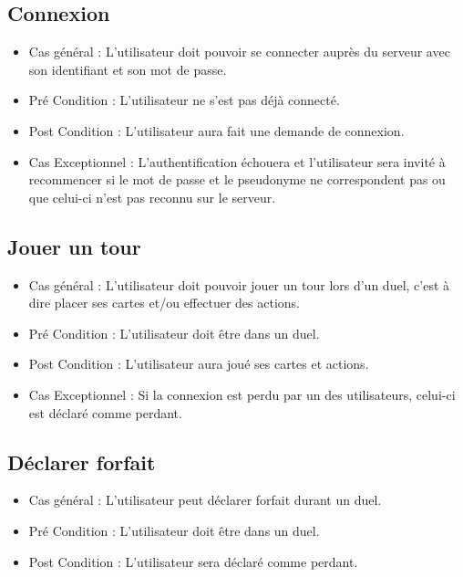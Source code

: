 \subsection{Connexion}

\begin{itemize}
    \item Cas général : L'utilisateur doit pouvoir se connecter auprès du {serveur} avec son identifiant et son mot de passe.
    \item Pré Condition  : L'utilisateur ne s'est pas déjà connecté.
    \item Post Condition : L'utilisateur aura fait une demande de connexion.
    \item Cas Exceptionnel : L'authentification échouera et l'utilisateur sera invité à recommencer si le mot de passe et le pseudonyme ne correspondent pas ou que celui-ci n'est pas reconnu sur le serveur.
\end{itemize}

\subsection{Jouer un tour}
\begin{itemize}
    \item Cas général : L'utilisateur doit pouvoir jouer un tour lors d'un duel, c'est à dire placer ses cartes et/ou effectuer des actions.
    \item Pré Condition  : L'utilisateur doit être dans un duel.
    \item Post Condition : L'utilisateur aura joué ses cartes et actions.
    \item Cas Exceptionnel : Si la connexion est perdu par un des utilisateurs, celui-ci est déclaré comme perdant.
\end{itemize}

\subsection{Déclarer forfait}
\begin{itemize}
    \item Cas général : L'utilisateur peut déclarer forfait durant un duel.
    \item Pré Condition  : L'utilisateur doit être dans un duel.
    \item Post Condition : L'utilisateur sera déclaré comme perdant.
\end{itemize}

